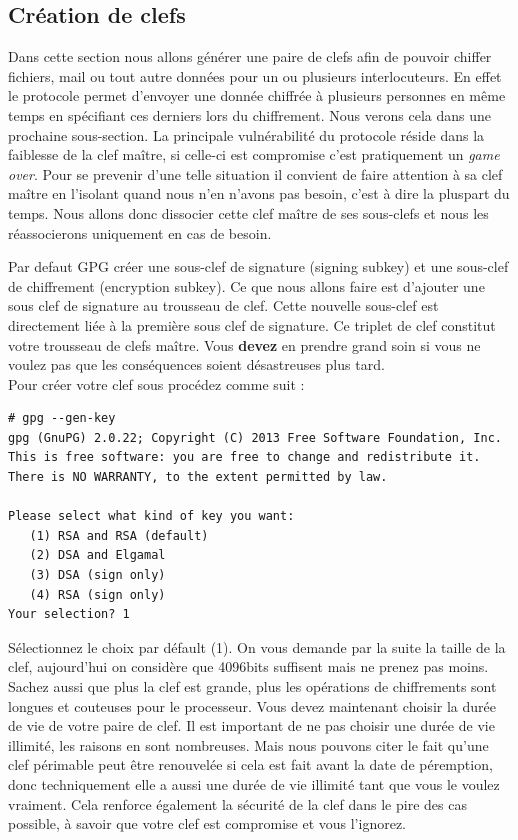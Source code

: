\documentclass[a4paper]{article}
\begin{document}
\subsection{Création de clefs}

Dans cette section nous allons générer une paire de clefs afin de pouvoir
chiffer fichiers, mail ou tout autre données pour un ou plusieurs
interlocuteurs. En effet le protocole permet d'envoyer une donnée chiffrée à
plusieurs personnes en même temps en spécifiant ces derniers lors du
chiffrement. Nous verons cela dans une prochaine sous-section.
La principale vulnérabilité du protocole réside dans la faiblesse de la clef
maître, si celle-ci est compromise c'est pratiquement un \emph{game over}.
Pour se prevenir d'une telle situation il convient de faire attention à sa clef
maître en l'isolant quand nous n'en n'avons pas besoin, c'est à dire la pluspart
du temps. Nous allons donc dissocier cette clef maître de ses sous-clefs et
nous les réassocierons uniquement en cas de besoin.

Par defaut \textsc{GPG} créer une sous-clef de signature (signing subkey) et
une sous-clef de chiffrement (encryption subkey). Ce que nous allons faire est
d'ajouter une sous clef de signature au trousseau de clef. Cette nouvelle
sous-clef est directement liée à la première sous clef de signature. Ce triplet
de clef constitut votre trousseau de clefs maître. Vous \textbf{devez} en prendre grand
soin si vous ne voulez pas que les conséquences soient désastreuses plus tard.
\\
Pour créer votre clef sous procédez comme suit :
\begin{verbatim}
# gpg --gen-key
gpg (GnuPG) 2.0.22; Copyright (C) 2013 Free Software Foundation, Inc.
This is free software: you are free to change and redistribute it.
There is NO WARRANTY, to the extent permitted by law.

Please select what kind of key you want:
   (1) RSA and RSA (default)
   (2) DSA and Elgamal
   (3) DSA (sign only)
   (4) RSA (sign only)
Your selection? 1
\end{verbatim}

Sélectionnez le choix par défault (1). On vous demande par la suite la taille
de la clef, aujourd'hui on considère que 4096bits suffisent mais ne prenez pas
moins. Sachez aussi que plus la clef est grande, plus les opérations de
chiffrements sont longues et couteuses pour le processeur.
Vous devez maintenant choisir la durée de vie de votre paire de clef. Il est
important de ne pas choisir une durée de vie illimité, les raisons en sont
nombreuses. Mais nous pouvons citer le fait qu'une clef périmable peut être
renouvelée si cela est fait avant la date de péremption, donc techniquement elle
a aussi une durée de vie illimité tant que vous le voulez vraiment.
Cela renforce également la sécurité de la clef dans le pire des cas possible,
à savoir que votre clef est compromise et vous l'ignorez.
\end{document}
